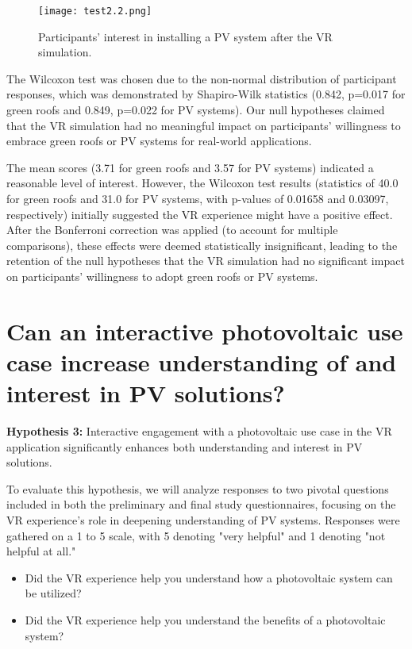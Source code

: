 \documentclass[draft, final]{vutinfth} %
\begin{document}
\begin{figure}[h]
\centering
\texttt{[image: test2.2.png]}
\caption[Interest in PV system installation post-VR]{Participants' interest in installing a PV system after the VR simulation.}
\label{fig:interest-pv-system}
\end{figure}

The Wilcoxon test was chosen due to the non-normal distribution of participant responses, which was demonstrated by Shapiro-Wilk statistics (0.842, p=0.017 for green roofs and 0.849, p=0.022 for PV systems). Our null hypotheses claimed that the VR simulation had no meaningful impact on participants' willingness to embrace green roofs or PV systems for real-world applications.

The mean scores (3.71 for green roofs and 3.57 for PV systems) indicated a reasonable level of interest. However, the Wilcoxon test results (statistics of 40.0 for green roofs and 31.0 for PV systems, with p-values of 0.01658 and 0.03097, respectively) initially suggested the VR experience might have a positive effect. After the Bonferroni correction was applied (to account for multiple comparisons), these effects were deemed statistically insignificant, leading to the retention of the null hypotheses that the VR simulation had no significant impact on participants' willingness to adopt green roofs or PV systems.

\section{Can an interactive photovoltaic use case increase understanding of and interest in PV solutions?}

\textbf{Hypothesis 3:} Interactive engagement with a photovoltaic use case in the VR application significantly enhances both understanding and interest in PV solutions.

To evaluate this hypothesis, we will analyze responses to two pivotal questions included in both the preliminary and final study questionnaires, focusing on the VR experience's role in deepening understanding of PV systems. Responses were gathered on a 1 to 5 scale, with 5 denoting "very helpful" and 1 denoting "not helpful at all."
\begin{itemize}
    \item Did the VR experience help you understand how a photovoltaic system can be utilized?
    \item Did the VR experience help you understand the benefits of a photovoltaic system?
\end{itemize}
\end{document}
